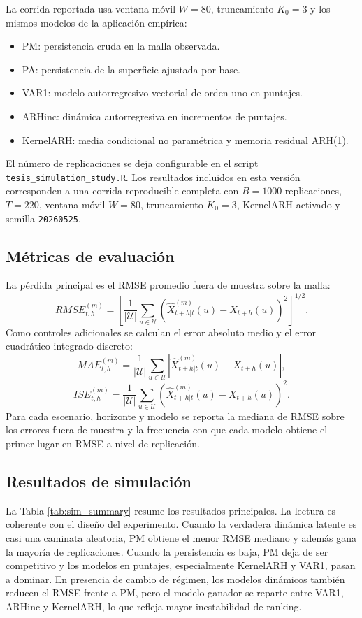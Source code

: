 \documentclass[a4paper,11pt]{article}
\begin{document}
La corrida reportada usa ventana móvil \(W=80\), truncamiento \(K_0=3\) y los mismos modelos de la aplicación empírica:
\begin{itemize}
  \item PM: persistencia cruda en la malla observada.
  \item PA: persistencia de la superficie ajustada por base.
  \item VAR1: modelo autorregresivo vectorial de orden uno en puntajes.
  \item ARHinc: dinámica autorregresiva en incrementos de puntajes.
  \item KernelARH: media condicional no paramétrica y memoria residual ARH(1).
\end{itemize}

El número de replicaciones se deja configurable en el script \texttt{tesis\_simulation\_study.R}. Los resultados incluidos en esta versión corresponden a una corrida reproducible completa con \(B=1000\) replicaciones, \(T=220\), ventana móvil \(W=80\), truncamiento \(K_0=3\), KernelARH activado y semilla \texttt{20260525}.

\subsection{Métricas de evaluación}

La pérdida principal es el RMSE promedio fuera de muestra sobre la malla:
\[
  RMSE_{t,h}^{(m)}
  =
  \left[
  \frac{1}{|\mathcal{U}|}
  \sum_{u\in\mathcal{U}}
  \left(
  \widehat X_{t+h|t}^{(m)}(u)-X_{t+h}(u)
  \right)^2
  \right]^{1/2}.
\]
Como controles adicionales se calculan el error absoluto medio y el error cuadrático integrado discreto:
\[
  MAE_{t,h}^{(m)}
  =
  \frac{1}{|\mathcal{U}|}
  \sum_{u\in\mathcal{U}}
  \left|
  \widehat X_{t+h|t}^{(m)}(u)-X_{t+h}(u)
  \right|,
\]
\[
  ISE_{t,h}^{(m)}
  =
  \frac{1}{|\mathcal{U}|}
  \sum_{u\in\mathcal{U}}
  \left(
  \widehat X_{t+h|t}^{(m)}(u)-X_{t+h}(u)
  \right)^2.
\]
Para cada escenario, horizonte y modelo se reporta la mediana de RMSE sobre los errores fuera de muestra y la frecuencia con que cada modelo obtiene el primer lugar en RMSE a nivel de replicación.

\subsection{Resultados de simulación}

La Tabla \ref{tab:sim_summary} resume los resultados principales. La lectura es coherente con el diseño del experimento. Cuando la verdadera dinámica latente es casi una caminata aleatoria, PM obtiene el menor RMSE mediano y además gana la mayoría de replicaciones. Cuando la persistencia es baja, PM deja de ser competitivo y los modelos en puntajes, especialmente KernelARH y VAR1, pasan a dominar. En presencia de cambio de régimen, los modelos dinámicos también reducen el RMSE frente a PM, pero el modelo ganador se reparte entre VAR1, ARHinc y KernelARH, lo que refleja mayor inestabilidad de ranking.
\end{document}
